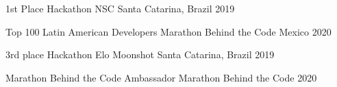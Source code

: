 



\begin{cvhonors}

  \cvhonor
    {1st Place} %
    {Hackathon NSC} %
    {Santa Catarina, Brazil} %
    {2019} %

  \cvhonor
    {Top 100 Latin American Developers} %
    {Marathon Behind the Code} %
    {Mexico} %
    {2020} %

  \cvhonor
    {3rd place} %
    {Hackathon Elo Moonshot} %
    {Santa Catarina, Brazil} %
    {2019} %


\end{cvhonors}




\begin{cvhonors}

  \cvhonor
    {Marathon Behind the Code Ambassador} %
    {Marathon Behind the Code} %
    {} %
    {2020} %

\end{cvhonors}
